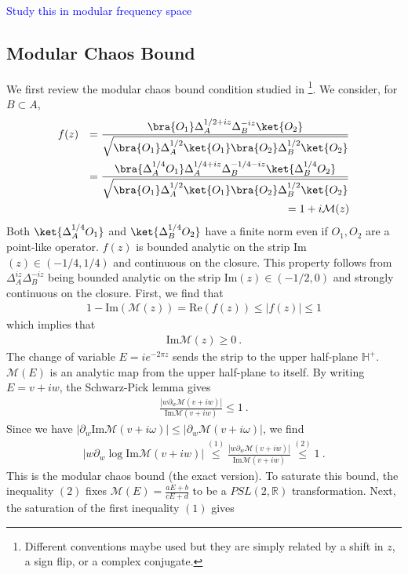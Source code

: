 \documentclass[a4paper,11pt]{article}
\theoremstyle{definition}
\theoremstyle{remark}
\newcommand{\nn}{\nonumber}
\newcommand{\mM}{\mathcal{M}}
\newcommand{\NL}[1]{\textcolor{blue}{#1}}
\newcommand{\p}{\partial}
\begin{document}
\NL{Study this in modular frequency space}

\subsection{Modular Chaos Bound}
We first review the modular chaos bound condition studied in \cite{}\footnote{Different conventions maybe used but they are simply related by a shift in $z$, a sign flip, or a complex conjugate.}. We consider, for $B \subset A$,
\begin{eqnarray}
    f(z)&&=\frac{\bra{O_1}\Delta_A^{1/2+iz}\Delta_B^{-iz}\ket{O_2}}{\sqrt{\bra{O_1}\Delta_A^{1/2}\ket{O_1} \bra{O_2}\Delta_B^{1/2}\ket{O_2}}}\\
    &&=\frac{\bra{\Delta_A^{1/4}O_1} \Delta_A^{1/4+iz}\Delta_B^{-1/4-iz}\ket{\Delta_B^{1/4} O_2}}{\sqrt{\bra{O_1}\Delta_A^{1/2}\ket{O_1} \bra{O_2}\Delta_B^{1/2}\ket{O_2}}}\nn\\
    &&=1+i \mathcal{M}(z)
\end{eqnarray}
Both $\ket{\Delta_A^{1/4}O_1}$ and $\ket{\Delta_B^{1/4} O_2}$ have a finite norm even if $O_1, O_2$ are a point-like operator. $f(z)$ is bounded analytic on the strip Im$(z) \in (-1/4,1/4)$ and continuous on the closure. This property follows from $\Delta_A^{iz}\Delta_B^{-iz}$ being bounded analytic on the strip Im$(z) \in (-1/2,0)$ and strongly continuous on the closure. 
First, we find that 
\begin{eqnarray}
    1-\text{Im}(\mathcal{M}(z))=\text{Re}(f(z))\leq |f(z)|\leq 1
\end{eqnarray}
which implies that 
\begin{eqnarray}
    \text{Im}\mathcal{M}(z)\geq 0\ .
\end{eqnarray}
The change of variable $E=ie^{-2\pi z}$ sends the strip to the upper half-plane $\mathbb{H}^+$. $\mM(E)$ is an analytic map from the upper half-plane to itself. By writing $E=v+iw$, the Schwarz-Pick lemma gives
\begin{eqnarray}
    \frac{|w \p_w \mM(v+iw)|}{\text{Im} \mM(v+iw)}\leq 1\ . 
\end{eqnarray}
Since we have $|\p_w \text{Im}\mM(v+i\omega)|\leq |\p_w \mM(v+i\omega)|$, we find
\begin{eqnarray}
    |w\p_w \log \text{Im} \mM(v+iw)| \stackrel{(1)}{\leq} \frac{|w \p_w \mM(v+iw)|}{\text{Im} \mM(v+iw)} \stackrel{(2)}{\leq} 1\ .
\end{eqnarray}
This is the modular chaos bound (the exact version). To saturate this bound, the inequality $(2)$ fixes $\mM(E)=\frac{a E+b}{c E+d}$ to be a $PSL(2,\mathbb{R})$ transformation. Next, the saturation of the first inequality $(1)$ gives
\end{document}
